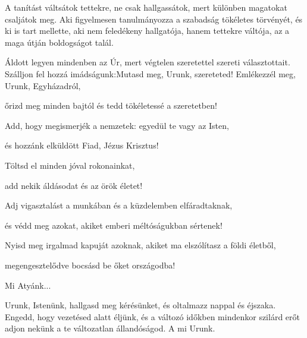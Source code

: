 \documentclass[twoside]{article}
\begin{document}
A tanítást váltsátok tettekre, ne csak hallgassátok, mert különben magatokat csaljátok meg. Aki figyelmesen tanulmányozza a szabadság tökéletes törvényét, és ki is tart mellette, aki nem feledékeny hallgatója, hanem tettekre váltója, az a maga útján boldogságot talál.



\begin{preces}{Áldott legyen mindenben az Úr, mert végtelen szeretettel szereti választottait. Szálljon fel hozzá imádságunk:}{Mutasd meg, Urunk, szereteted!}
  Emlékezzél meg, Urunk, Egyházadról,

  \reddash őrizd meg minden bajtól és tedd tökéletessé a szeretetben!

  Add, hogy megismerjék a nemzetek: egyedül te vagy az Isten,

  \reddash és hozzánk elküldött Fiad, Jézus Krisztus!

  Töltsd el minden jóval rokonainkat,

  \reddash add nekik áldásodat és az örök életet!

  Adj vigasztalást a munkában és a küzdelemben elfáradtaknak,

  \reddash és védd meg azokat, akiket emberi méltóságukban sértenek!

  Nyisd meg irgalmad kapuját azoknak, akiket ma elszólítasz a földi életből,

  \reddash megengesztelődve bocsásd be őket országodba!
\end{preces}
Mi Atyánk...

Urunk, Istenünk, hallgasd meg kérésünket, és oltalmazz nappal és éjszaka. Engedd, hogy vezetésed alatt éljünk, és a változó időkben mindenkor szilárd erőt adjon nekünk a te változatlan állandóságod. A mi Urunk.
\end{document}
